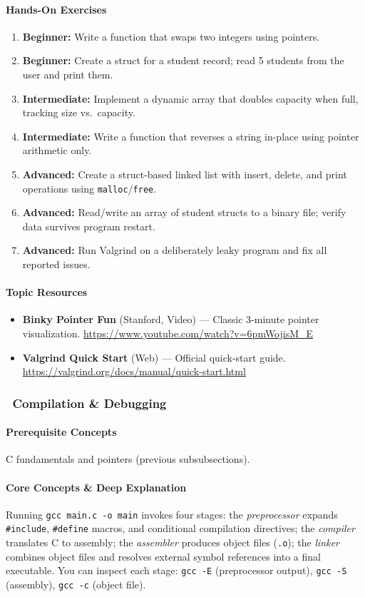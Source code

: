 \documentclass[11pt, a4paper, oneside]{report}
\newcommand{\awareness}[1]{\subsubsection{\texorpdfstring{\fcolorbox{gray!50}{gray!10}{\footnotesize\bfseries\color{gray!50!black} AWARENESS}~#1}{#1}}}
\begin{document}
\paragraph{Hands-On Exercises}
\begin{enumerate}[leftmargin=*]
\item \textbf{Beginner:} Write a function that swaps two integers using pointers.
\item \textbf{Beginner:} Create a struct for a student record; read 5 students from the user and print them.
\item \textbf{Intermediate:} Implement a dynamic array that doubles capacity when full, tracking size vs.\ capacity.
\item \textbf{Intermediate:} Write a function that reverses a string in-place using pointer arithmetic only.
\item \textbf{Advanced:} Create a struct-based linked list with insert, delete, and print operations using \texttt{malloc}/\texttt{free}.
\item \textbf{Advanced:} Read/write an array of student structs to a binary file; verify data survives program restart.
\item \textbf{Advanced:} Run Valgrind on a deliberately leaky program and fix all reported issues.
\end{enumerate}

\paragraph{Topic Resources}
\begin{itemize}[leftmargin=*]
\item \textbf{Binky Pointer Fun} (Stanford, Video) --- Classic 3-minute pointer visualization. \url{https://www.youtube.com/watch?v=6pmWojisM_E}
\item \textbf{Valgrind Quick Start} (Web) --- Official quick-start guide. \url{https://valgrind.org/docs/manual/quick-start.html}
\end{itemize}

\awareness{Compilation \& Debugging}

\paragraph{Prerequisite Concepts} C fundamentals and pointers (previous subsubsections).

\paragraph{Core Concepts \& Deep Explanation} Running \texttt{gcc main.c -o main} invokes four stages: the \emph{preprocessor} expands \texttt{\#include}, \texttt{\#define} macros, and conditional compilation directives; the \emph{compiler} translates C to assembly; the \emph{assembler} produces object files (\texttt{.o}); the \emph{linker} combines object files and resolves external symbol references into a final executable. You can inspect each stage: \texttt{gcc -E} (preprocessor output), \texttt{gcc -S} (assembly), \texttt{gcc -c} (object file).
\end{document}
